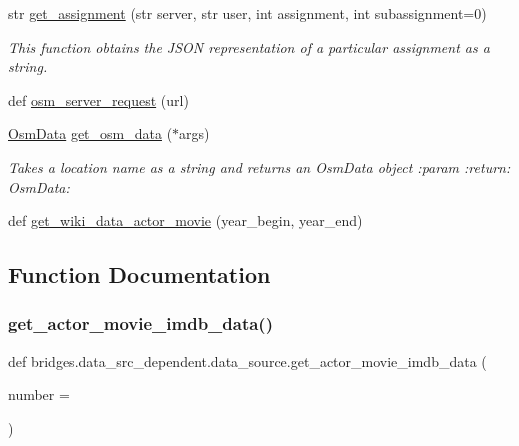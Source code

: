 \begin{DoxyCompactItemize}
str \mbox{\hyperlink{namespacebridges_1_1data__src__dependent_1_1data__source_ada4137e0574e7f4875f83cf4afdc74d5}{get\+\_\+assignment}} (str server, str user, int assignment, int subassignment=0)
\begin{DoxyCompactList}\small\item\em This function obtains the J\+S\+ON representation of a particular assignment as a string. \end{DoxyCompactList}\item 
def \mbox{\hyperlink{namespacebridges_1_1data__src__dependent_1_1data__source_a5644517c9ee0f5ab9e59a4f4d64fa038}{osm\+\_\+server\+\_\+request}} (url)
\item 
\mbox{\hyperlink{classbridges_1_1data__src__dependent_1_1osm_1_1_osm_data}{Osm\+Data}} \mbox{\hyperlink{namespacebridges_1_1data__src__dependent_1_1data__source_ae33c7ed8751b98e913b4485c0b124ed3}{get\+\_\+osm\+\_\+data}} ($\ast$args)
\begin{DoxyCompactList}\small\item\em Takes a location name as a string and returns an Osm\+Data object \+:param \+:return\+: Osm\+Data\+: \end{DoxyCompactList}\item 
def \mbox{\hyperlink{namespacebridges_1_1data__src__dependent_1_1data__source_a15db0d52db8b6e096db60f99b2f0171d}{get\+\_\+wiki\+\_\+data\+\_\+actor\+\_\+movie}} (year\+\_\+begin, year\+\_\+end)
\end{DoxyCompactItemize}


\subsection{Function Documentation}
\mbox{\label{namespacebridges_1_1data__src__dependent_1_1data__source_a5a685fd00b37b99d63e706289dad9063}} 
\subsubsection{\texorpdfstring{get\_actor\_movie\_imdb\_data()}{get\_actor\_movie\_imdb\_data()}}
{\footnotesize\ttfamily def bridges.\+data\+\_\+src\+\_\+dependent.\+data\+\_\+source.\+get\+\_\+actor\+\_\+movie\+\_\+imdb\+\_\+data (\begin{DoxyParamCaption}\item[{}]{number = {} }\end{DoxyParamCaption})}



